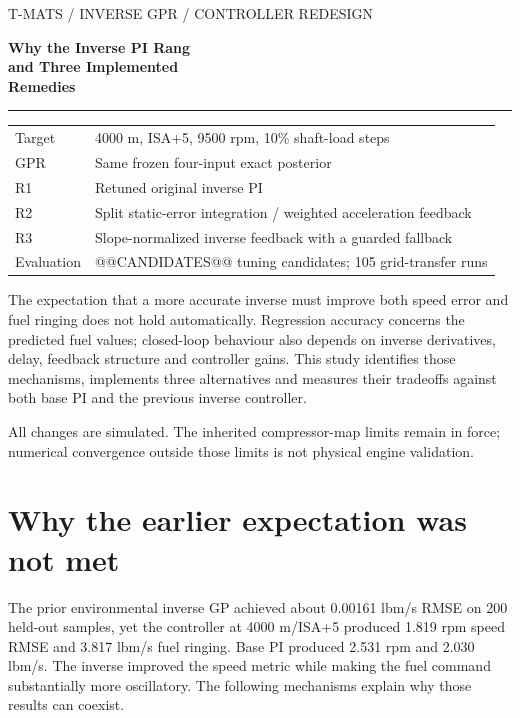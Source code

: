 \begin{titlepage}\color{navy}\sffamily
{\small T-MATS / INVERSE GPR / CONTROLLER REDESIGN}\par\vspace{20mm}
{\fontsize{29}{35}\selectfont\bfseries Why the Inverse PI Rang\\and Three Implemented\\Remedies\par}
\vspace{10mm}{\Large Diagnosis, joint-objective tuning,\\and frozen-parameter environmental transfer\par}
\vspace{10mm}\color{teal}\rule{\linewidth}{1.2pt}\color{navy}\vspace{10mm}
\begin{tabular}{@{}ll}
Target & 4000 m, ISA+5, 9500 rpm, 10\% shaft-load steps\\[5pt]
GPR & Same frozen four-input exact posterior\\[5pt]
R1 & Retuned original inverse PI\\[5pt]
R2 & Split static-error integration / weighted acceleration feedback\\[5pt]
R3 & Slope-normalized inverse feedback with a guarded fallback\\[5pt]
Evaluation & @@CANDIDATES@@ tuning candidates; 105 grid-transfer runs
\end{tabular}
\par\vspace{12mm}\normalfont\color{ink}
The expectation that a more accurate inverse must improve both speed error and fuel ringing does not hold automatically. Regression accuracy concerns the predicted fuel values; closed-loop behaviour also depends on inverse derivatives, delay, feedback structure and controller gains. This study identifies those mechanisms, implements three alternatives and measures their tradeoffs against both base PI and the previous inverse controller.

\vfill All changes are simulated. The inherited compressor-map limits remain in force; numerical convergence outside those limits is not physical engine validation.
\end{titlepage}
\tableofcontents\clearpage

\section{Why the earlier expectation was not met}
The prior environmental inverse GP achieved about 0.00161 lbm/s RMSE on 200 held-out samples, yet the controller at 4000 m/ISA+5 produced 1.819 rpm speed RMSE and 3.817 lbm/s fuel ringing. Base PI produced 2.531 rpm and 2.030 lbm/s. The inverse improved the speed metric while making the fuel command substantially more oscillatory. The following mechanisms explain why those results can coexist.

